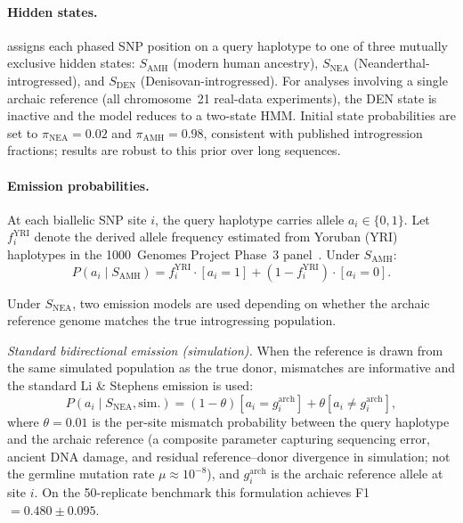 \paragraph{Hidden states.}
\AP{} assigns each phased SNP position on a query haplotype to one of three
mutually exclusive hidden states: $S_\mathrm{AMH}$ (modern human ancestry),
$S_\mathrm{NEA}$ (Neanderthal-introgressed), and $S_\mathrm{DEN}$
(Denisovan-introgressed).
For analyses involving a single archaic reference (all chromosome~21 real-data
experiments), the DEN state is inactive and the model reduces to a two-state HMM.
Initial state probabilities are set to $\pi_\mathrm{NEA} = 0.02$ and
$\pi_\mathrm{AMH} = 0.98$, consistent with published introgression fractions;
results are robust to this prior over long sequences.

\paragraph{Emission probabilities.}
At each biallelic SNP site $i$, the query haplotype carries allele $a_i \in \{0, 1\}$.
Let $f_i^\mathrm{YRI}$ denote the derived allele frequency estimated from Yoruban
(YRI) haplotypes in the 1000~Genomes Project Phase~3 panel~\citep{genomes20151000}.
Under $S_\mathrm{AMH}$:
\begin{equation}
  P(a_i \mid S_\mathrm{AMH}) = f_i^\mathrm{YRI} \cdot [a_i=1] + (1 - f_i^\mathrm{YRI}) \cdot [a_i=0].
  \label{eq:emiss_amh}
\end{equation}

Under $S_\mathrm{NEA}$, two emission models are used depending on whether the
archaic reference genome matches the true introgressing population.

\emph{Standard bidirectional emission (simulation).}
When the reference is drawn from the same simulated population as the true donor,
mismatches are informative and the standard Li \& Stephens emission is used:
\begin{equation}
  P(a_i \mid S_\mathrm{NEA}, \text{sim.}) =
  (1-\theta)[a_i = g_i^\mathrm{arch}] + \theta[a_i \neq g_i^\mathrm{arch}],
  \label{eq:emiss_nea_std}
\end{equation}
where $\theta = 0.01$ is the per-site mismatch probability between the query
haplotype and the archaic reference (a composite parameter capturing
sequencing error, ancient DNA damage, and residual reference--donor
divergence in simulation; not the germline mutation rate $\mu \approx 10^{-8}$),
and $g_i^\mathrm{arch}$ is the archaic reference allele at site $i$.
On the 50-replicate benchmark this formulation achieves F1 $= 0.480 \pm 0.095$.

